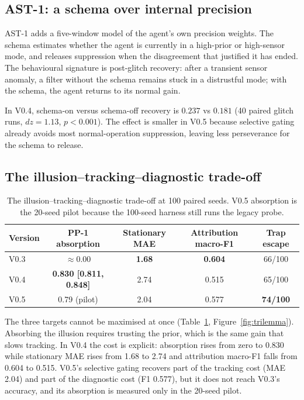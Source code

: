 \documentclass[11pt,a4paper]{article}
\begin{document}
\subsection{AST-1: a schema over internal precision}

AST-1 adds a five-window model of the agent's own precision weights. The schema estimates whether the agent is currently in a high-prior or high-sensor mode, and releases suppression when the disagreement that justified it has ended. The behavioural signature is post-glitch recovery: after a transient sensor anomaly, a filter without the schema remains stuck in a distrustful mode; with the schema, the agent returns to its normal gain.

In V0.4, schema-on versus schema-off recovery is $\mathbf{0.237}$ vs $\mathbf{0.181}$ (40 paired glitch runs, $dz=1.13$, $p<0.001$). The effect is smaller in V0.5 because selective gating already avoids most normal-operation suppression, leaving less perseverance for the schema to release.

\subsection{The illusion--tracking--diagnostic trade-off}

\begin{table}[t]
\centering
\small
\caption{The illusion--tracking--diagnostic trade-off at 100 paired seeds. V0.5 absorption is the 20-seed pilot because the 100-seed harness still runs the legacy probe.}
\label{tab:trilemma}
\begin{tabular}{lcccc}
\toprule
Version & PP-1 absorption & Stationary MAE & Attribution macro-F1 & Trap escape \\
\midrule
V0.3 & $\approx 0.00$ & \textbf{1.68} & \textbf{0.604} & 66/100 \\
V0.4 & \textbf{0.830 [0.811, 0.848]} & 2.74 & 0.515 & 65/100 \\
V0.5 & 0.79 (pilot) & 2.04 & 0.577 & \textbf{74/100} \\
\bottomrule
\end{tabular}
\end{table}

The three targets cannot be maximised at once (Table~\ref{tab:trilemma}, Figure~\ref{fig:trilemma}). Absorbing the illusion requires trusting the prior, which is the same gain that slows tracking. In V0.4 the cost is explicit: absorption rises from zero to 0.830 while stationary MAE rises from 1.68 to 2.74 and attribution macro-F1 falls from 0.604 to 0.515. V0.5's selective gating recovers part of the tracking cost (MAE 2.04) and part of the diagnostic cost (F1 0.577), but it does not reach V0.3's accuracy, and its absorption is measured only in the 20-seed pilot.
\end{document}
